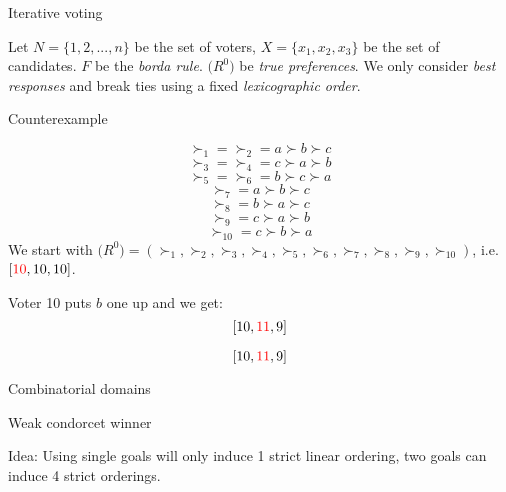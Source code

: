 \documentclass[12pt]{article}
\newenvironment{question}[2][Question]{\begin{trivlist}
\item[\hskip \labelsep {\bfseries #1}\hskip \labelsep {\bfseries #2.}]}{\end{trivlist}}
\newenvironment{answer}[2][Answer]{\begin{trivlist}
\item[\hskip \labelsep {\bfseries #1}\hskip \labelsep {\bfseries #2:}]}{\end{trivlist}}
\begin{document}
\begin{question}{2}{Iterative voting}

Let $N=\{1,2, ..., n\}$ be the set of voters, $X=\{x_1,x_2,x_3\}$ be the set of candidates. $F$ be the \textit{borda rule}. $\boldsymbol(R^0)$ be \textit{true preferences}. We only consider \textit{best responses} and break ties using a fixed \textit{lexicographic order}.
\end{question}

\begin{answer}{a)}{Counterexample}

$$\succ_1=\succ_2=a\succ b\succ c$$
$$\succ_3=\succ_4=c\succ a\succ b$$
$$\succ_5=\succ_6=b\succ c\succ a$$
$$\succ_7=a\succ b\succ c$$
$$\succ_8=b\succ a\succ c$$
$$\succ_9=c\succ a\succ b$$
$$\succ_10=c\succ b\succ a$$
We start with $\boldsymbol(R^0)=(\succ_1,\succ_2,\succ_3,\succ_4,\succ_5,\succ_6,\succ_7,\succ_8,\succ_9,\succ_10)$, i.e. $[\textcolor{red}{10},10,10]$.

Voter 10 puts $b$ one up and we get:
$$[10,\textcolor{red}{11},9]$$

$$[10,\textcolor{red}{11},9]$$

\end{answer}

\begin{question}{3}{Combinatorial domains}


\end{question}

\begin{answer}{a)}{Weak condorcet winner}

Idea: Using single goals will only induce 1 strict linear ordering, two goals can induce 4 strict orderings.

\end{answer}
\end{document}
